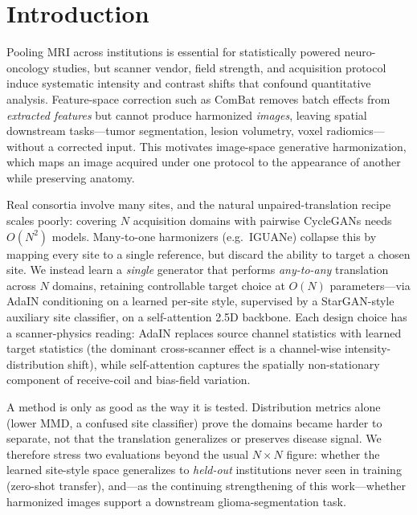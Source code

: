 \documentclass[runningheads]{llncs}
\begin{document}
\section{Introduction}
\label{sec:intro}
Pooling MRI across institutions is essential for statistically powered
neuro-oncology studies, but scanner vendor, field strength, and acquisition
protocol induce systematic intensity and contrast shifts that confound
quantitative analysis. Feature-space correction such as ComBat removes batch
effects from \emph{extracted features} but cannot produce harmonized
\emph{images}, leaving spatial downstream tasks---tumor segmentation, lesion
volumetry, voxel radiomics---without a corrected input. This motivates
image-space generative harmonization, which maps an image acquired under one
protocol to the appearance of another while preserving anatomy.

Real consortia involve many sites, and the natural unpaired-translation recipe
scales poorly: covering $N$ acquisition domains with pairwise CycleGANs needs
$O(N^2)$ models. Many-to-one harmonizers (e.g.\ IGUANe) collapse this by mapping
every site to a single reference, but discard the ability to target a chosen
site. We instead learn a \emph{single} generator that performs \emph{any-to-any}
translation across $N$ domains, retaining controllable target choice at $O(N)$
parameters---via AdaIN conditioning on a learned per-site style, supervised by a
StarGAN-style auxiliary site classifier, on a self-attention 2.5D backbone. Each
design choice has a scanner-physics reading: AdaIN replaces source channel
statistics with learned target statistics (the dominant cross-scanner effect is a
channel-wise intensity-distribution shift), while self-attention captures the
spatially non-stationary component of receive-coil and bias-field variation.

A method is only as good as the way it is tested. Distribution metrics alone
(lower MMD, a confused site classifier) prove the domains became harder to
separate, not that the translation generalizes or preserves disease signal. We
therefore stress two evaluations beyond the usual $N{\times}N$ figure: whether the
learned site-style space generalizes to \emph{held-out} institutions never seen in
training (zero-shot transfer), and---as the continuing strengthening of this
work---whether harmonized images support a downstream glioma-segmentation task.
\end{document}
